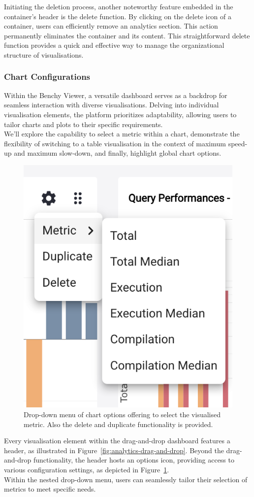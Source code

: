 Initiating the deletion process, another noteworthy feature embedded in the container's header is the delete function. By clicking on the delete icon of a container, users can efficiently remove an analytics section. This action permanently eliminates the container and its content. This straightforward delete function provides a quick and effective way to manage the organizational structure of visualisations.


\subsubsection{Chart Configurations}\label{sec:chart-configuration}

Within the Benchy Viewer, a versatile dashboard serves as a backdrop for seamless interaction with diverse visualisations. Delving into individual visualisation elements, the platform prioritizes adaptability, allowing users to tailor charts and plots to their specific requirements.\\
We'll explore the capability to select a metric within a chart, demonstrate the flexibility of switching to a table visualisation in the context of maximum speed-up and maximum slow-down, and finally, highlight global chart options.

\begin{figure}[h]
  \centering
  \includegraphics[width=0.35\linewidth]{figures/chart-configuration.png}
  \caption{Drop-down menu of chart options offering to select the visualised metric. Also the delete and duplicate functionality is provided.}
  \label{fig:chart-configuration}
\end{figure}

Every visualisation element within the drag-and-drop dashboard features a header, as illustrated in Figure~\ref{fig:analytics-drag-and-drop}. Beyond the drag-and-drop functionality, the header hosts an options icon, providing access to various configuration settings, as depicted in Figure~\ref{fig:chart-configuration}.\\
Within the nested drop-down menu, users can seamlessly tailor their selection of metrics to meet specific needs.

